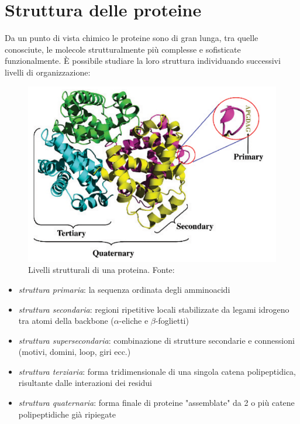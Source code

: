 \section{Struttura delle proteine}
{
Da un punto di vista chimico le proteine sono di gran lunga, tra quelle conosciute, le molecole strutturalmente più complesse e sofisticate funzionalmente. È possibile studiare la loro struttura individuando successivi livelli di organizzazione:

\begin{figure}[!htp]
	\centering
	\includegraphics[scale=0.5]{images/strutture-proteina.png}
	\caption{Livelli strutturali di una proteina. Fonte: \cite{kessel_ben-tal_2018}}
	\label{fig:strutture-proteine}
\end{figure}

\begin{itemize}
	\item \textit{struttura primaria}: la sequenza ordinata degli amminoacidi
	\item \textit{struttura secondaria}: regioni ripetitive locali stabilizzate da legami idrogeno tra atomi della backbone ($\alpha$-eliche e $\beta$-foglietti)
	\item \textit{struttura supersecondaria}: combinazione di strutture secondarie e connessioni (motivi, domini, loop, giri ecc.)
	\item \textit{struttura terziaria}: forma tridimensionale di una singola catena polipeptidica, risultante dalle interazioni dei residui
	\item \textit{struttura quaternaria}: forma finale di proteine "assemblate" da 2 o più catene polipeptidiche già ripiegate
\end{itemize}

}

